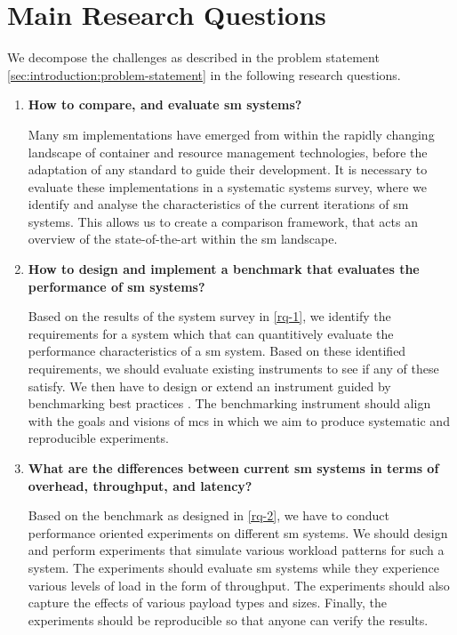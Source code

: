\section{Main Research Questions}
\label{sec:introduction:research-questions}

We decompose the challenges as described in the problem statement \cref{sec:introduction:problem-statement} in the following research questions.


\begin{enumerate}[label=\textbf{RQ\arabic*}, leftmargin=3\parindent]
    \item \textbf{How to compare, and evaluate \gls{sm} systems?}
    \label{rq-1}
    
    Many \gls{sm} implementations have emerged from within the rapidly changing landscape of container and resource management technologies, before the adaptation of any standard to guide their development. It is necessary to evaluate these implementations in a systematic systems survey, where we identify and analyse the characteristics of the current iterations of \gls{sm} systems. This allows us to create a comparison framework, that acts an overview of the state-of-the-art within the \gls{sm} landscape.
    
    \item \textbf{How to design and implement a benchmark that evaluates the performance of \gls{sm} systems?}
    \label{rq-2}
    
    Based on the results of the system survey in \ref{rq-1}, we identify the requirements for a system which that can quantitively evaluate the performance characteristics of a \gls{sm} system. Based on these identified requirements, we should evaluate existing instruments to see if any of these satisfy. We then have to design or extend an instrument guided by benchmarking best practices \cite{folkerts2012benchmarking}. The benchmarking instrument should align with the goals and visions of \gls{mcs} in which we aim to produce systematic and reproducible experiments.
    
    \item \textbf{What are the differences between current \gls{sm} systems in terms of overhead, throughput, and latency?}
    \label{rq-3}
    
    Based on the benchmark as designed in \ref{rq-2}, we have to conduct performance oriented experiments on different \gls{sm} systems. We should design and perform experiments that simulate various workload patterns for such a system. The experiments should evaluate \gls{sm} systems while they experience various levels of load in the form of throughput. The experiments should also capture the effects of various payload types and sizes. Finally, the experiments should be reproducible so that anyone can verify the results.
\end{enumerate}


